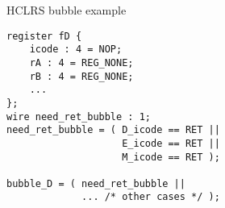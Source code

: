 \begin{frame}[fragile,label=retBubbleEx]{HCLRS bubble example}
\begin{Verbatim}[fontsize=\small]
register fD {
    icode : 4 = NOP;
    rA : 4 = REG_NONE;
    rB : 4 = REG_NONE;
    ...
};
wire need_ret_bubble : 1;
need_ret_bubble = ( D_icode == RET ||
                    E_icode == RET ||
                    M_icode == RET );

bubble_D = ( need_ret_bubble || 
             ... /* other cases */ );
\end{Verbatim}
\end{frame}


